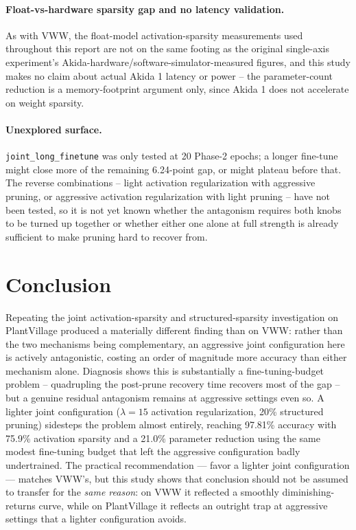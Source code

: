 \documentclass[11pt]{article}
\newcommand{\code}[1]{\texttt{#1}}
\begin{document}
\paragraph{Float-vs-hardware sparsity gap and no latency validation.} As with VWW, the float-model activation-sparsity measurements used throughout this report are not on the same footing as the original single-axis experiment's Akida-hardware/software-simulator-measured figures, and this study makes no claim about actual Akida 1 latency or power -- the parameter-count reduction is a memory-footprint argument only, since Akida 1 does not accelerate on weight sparsity.

\paragraph{Unexplored surface.} \code{joint\_long\_finetune} was only tested at 20 Phase-2 epochs; a longer fine-tune might close more of the remaining 6.24-point gap, or might plateau before that. The reverse combinations -- light activation regularization with aggressive pruning, or aggressive activation regularization with light pruning -- have not been tested, so it is not yet known whether the antagonism requires both knobs to be turned up together or whether either one alone at full strength is already sufficient to make pruning hard to recover from.

\section{Conclusion}

Repeating the joint activation-sparsity and structured-sparsity investigation on PlantVillage produced a materially different finding than on VWW: rather than the two mechanisms being complementary, an aggressive joint configuration here is actively antagonistic, costing an order of magnitude more accuracy than either mechanism alone. Diagnosis shows this is substantially a fine-tuning-budget problem -- quadrupling the post-prune recovery time recovers most of the gap -- but a genuine residual antagonism remains at aggressive settings even so. A lighter joint configuration ($\lambda=15$ activation regularization, 20\% structured pruning) sidesteps the problem almost entirely, reaching 97.81\% accuracy with 75.9\% activation sparsity and a 21.0\% parameter reduction using the same modest fine-tuning budget that left the aggressive configuration badly undertrained. The practical recommendation --- favor a lighter joint configuration --- matches VWW's, but this study shows that conclusion should not be assumed to transfer for the \emph{same reason}: on VWW it reflected a smoothly diminishing-returns curve, while on PlantVillage it reflects an outright trap at aggressive settings that a lighter configuration avoids.
\end{document}
